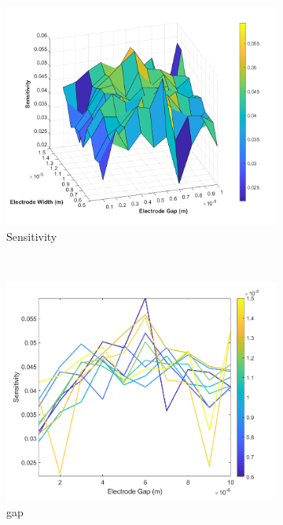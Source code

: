 \begin{figure}[h]
\begin{subfigure}[b]{0.49\textwidth}
        \includegraphics[width=\textwidth]{images/comsol_device_surface_sensitivity.png}
        \caption{Sensitivity}
    \end{subfigure}
    \\
    \vspace{0.1 in}
    \begin{subfigure}[b]{0.49\textwidth}
        \centering
        \includegraphics[width=\textwidth]{images/comsol_device_gapXsensitivity.png}
        \caption{gap}
    \end{subfigure}
    \hfill
    \begin{subfigure}[b]{0.49\textwidth}

\end{subfigure}
\end{figure}

